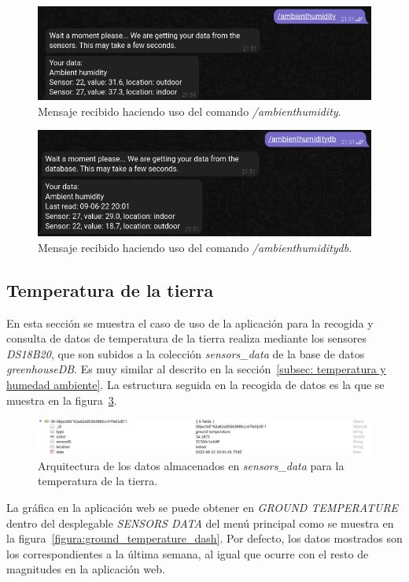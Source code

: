 \documentclass[a4paper, 12pt, oneside]{book}
\begin{document}
\begin{figure}[H]
	\centering
    \includegraphics[width=12cm, keepaspectratio]{img/ambienthumidity}
    \caption{Mensaje recibido haciendo uso del comando \textit{/ambienthumidity}.}
    \label{figura:ambienthumidity}
\end{figure}
\begin{figure}[H]
	\centering
    \includegraphics[width=12cm, keepaspectratio]{img/ambienthumiditydb}
    \caption{Mensaje recibido haciendo uso del comando \textit{/ambienthumiditydb}.}
    \label{figura:ambienthumiditydb}
\end{figure}

\subsection{Temperatura de la tierra}
\label{subsec: temperatura de la tierra}
En esta sección se muestra el caso de uso de la aplicación para la recogida y consulta de datos de temperatura de la tierra realiza mediante los sensores \textit{DS18B20}, que son subidos a la colección \textit{sensors\_data} de la base de datos \textit{greenhouseDB}. Es muy similar al descrito en la sección~\ref{subsec: temperatura y humedad ambiente}.
La estructura seguida en la recogida de datos es la que se muestra en la figura~\ref{figura:ground_temperature_robo3t}.

\begin{figure}[H]
	\centering
    \includegraphics[width=12cm, keepaspectratio]{img/ground_temperature_robo3t}
    \caption{Arquitectura de los datos almacenados en \textit{sensors\_data} para la temperatura de la tierra.}
    \label{figura:ground_temperature_robo3t}
\end{figure}
La gráfica en la aplicación web se puede obtener en \textit{GROUND TEMPERATURE} dentro del desplegable \textit{SENSORS DATA} del menú principal como se muestra en la figura~\ref{figura:ground_temperature_dash}. Por defecto, los datos mostrados son los correspondientes a la última semana, al igual que ocurre con el resto de magnitudes en la aplicación web.
\end{document}
